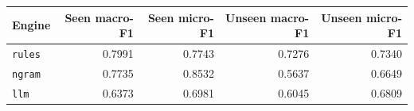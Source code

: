 \begingroup\small\setlength{\tabcolsep}{4pt}
\begin{tabular}{lrrrr}
\toprule
\textbf{Engine} & \textbf{Seen macro-F1} & \textbf{Seen micro-F1} & \textbf{Unseen macro-F1} & \textbf{Unseen micro-F1} \\  %
\midrule
\texttt{rules} & 0.7991 & 0.7743 & 0.7276 & 0.7340 \\  %
\texttt{ngram} & 0.7735 & 0.8532 & 0.5637 & 0.6649 \\  %
\texttt{llm} & 0.6373 & 0.6981 & 0.6045 & 0.6809 \\  %
\bottomrule
\end{tabular}
\endgroup
\par\smallskip{}
